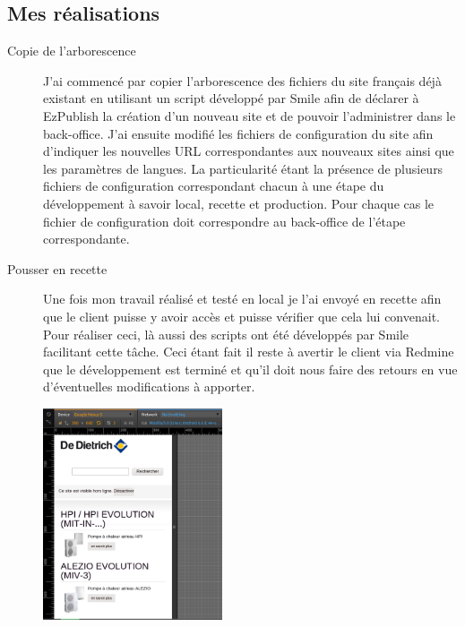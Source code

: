 \documentclass[a4paper,11pt,twoside]{report}
\begin{document}
    \subsection*{Mes réalisations}
      \begin{description}

	\item[Copie de l'arborescence] J'ai commencé par copier l'arborescence des fichiers du site français déjà existant en utilisant un script développé par Smile afin de déclarer à EzPublish la création d'un nouveau site et de pouvoir l'administrer dans le back-office. J'ai ensuite modifié les fichiers de configuration du site afin d'indiquer les nouvelles URL correspondantes aux nouveaux sites ainsi que les paramètres de langues. La particularité étant la présence de plusieurs fichiers de configuration correspondant chacun à une étape du développement à savoir local, recette et production. Pour chaque cas le fichier de configuration doit correspondre au back-office de l'étape correspondante.  
	\item[Pousser en recette] Une fois mon travail réalisé et testé en local je l'ai envoyé en recette afin que le client puisse y avoir accès et puisse vérifier que cela lui convenait. Pour réaliser ceci, là aussi des scripts ont été développés par Smile facilitant cette tâche. Ceci étant fait il reste à avertir le client via Redmine que le développement est terminé et qu'il doit nous faire des retours en vue d'éventuelles modifications à apporter.
	\begin{center}
	\includegraphics[width=200]{images/DDTH_home_be_fr.png} 

\end{center}
\end{description}
\end{document}
